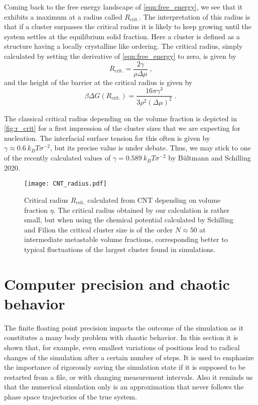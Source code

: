 Coming back to the free energy landscape of \autoref{eqn:free_energy}, we see that it exhibits a maximum at a radius called $R_{\text{crit.}}$. The interpretation of this radius is that if a cluster surpasses the critical radius it is likely to keep growing until the system settles at the equilibrium solid fraction. Here a cluster is defined as a structure having a locally crystalline like ordering. The critical radius, simply calculated by setting the derivative of \autoref{eqn:free_energy} to zero, is given by
\begin{equation}
\label{eqn:r_crit}
R_{\text{crit.}} = \frac{2 \gamma}{\rho \Delta \mu } \; \text{,}
\end{equation}
and the height of the barrier at the critical radius is given by
\begin{equation}
\beta \Delta G (R_{\text{crit.}}) = \frac{16 \pi \gamma^3}{3 \rho^2 (\Delta \mu )^2} \; \text{.}
\end{equation}

The classical critical radius depending on the volume fraction is depicted in \autoref{fig:r_crit} for a first impression of the cluster sizes that we are expecting for nucleation. The interfacial surface tension for this often is given by $\gamma \approx \SI{0.6}{k_B T \sigma^{-2}}$, but its precise value is under debate. Thus, we may stick to one of the recently calculated values of $\gamma = \SI{0.589}{k_B T \sigma^{-2}}$ by Bültmann and Schilling 2020\cite{Bultmann2020}. 
\begin{figure}[h]
\centering
\texttt{[image: CNT\_radius.pdf]}
\caption[Critical radius in the metastable regime]{Critical radius $R_{\text{crit.}}$ calculated from CNT depending on volume fraction $\eta$. The critical radius obtained by our calculation is rather small, but when using the chemical potential calculated by Schilling and Filion the critical cluster size is of the order $N \approx 50$ at intermediate metastable volume fractions, corresponding better to typical fluctuations of the largest cluster found in simulations.}
\label{fig:r_crit}
\end{figure}

\section{Computer precision and chaotic behavior}
\label{sec:precision}
The finite floating point precision impacts the outcome of the simulation as it constitutes a many body problem with chaotic behavior. In this section it is shown that, for example, even smallest variations of positions lead to radical changes of the simulation after a certain number of steps. It is used to emphasize the importance of rigorously saving the simulation state if it is supposed to be restarted from a file, or with changing measurement intervals. Also it reminds us that the numerical simulation only is an approximation that never follows the phase space trajectories of the true system.\\

